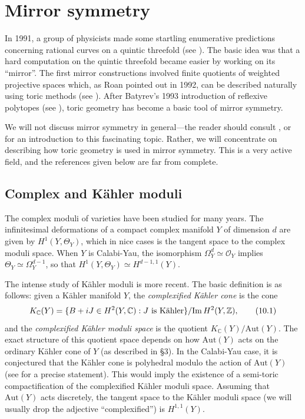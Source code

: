 \documentclass{amsart}
\theoremstyle{plain}
\theoremstyle{definition}
\begin{document}
\section{Mirror symmetry}

	In 1991, a group of physicists made some startling enumerative
predictions concerning rational curves on a quintic threefold (see
\cite{CdGP}).  The basic idea was that a hard computation on the
quintic threefold became easier by working on its ``mirror''.  The
first mirror constructions involved finite quotients of weighted
projective spaces which, as Roan pointed out in 1992, can be described
naturally using toric methods (see \cite{Roa2}).  After Batyrev's 1993
introduction of reflexive polytopes (see \cite{Bat1}), toric geometry
has become a basic tool of mirror symmetry.

	We will not discuss mirror symmetry in general---the reader
should consult \cite{Yau}, \cite{Mor3} or \cite{CK} for an
introduction to this fascinating topic.  Rather, we will concentrate
on describing how toric geometry is used in mirror symmetry.  This is
a very active field, and the references given below are far from
complete.

	\subsection{Complex and K\"ahler moduli} The complex
moduli of varieties have been studied for many years.  The
infinitesimal deformations of a compact complex manifold $Y$ of
dimension $d$ are given by $H^1(Y,\Theta_Y)$, which in nice cases is
the tangent space to the complex moduli space.  When $Y$ is
Calabi-Yau, the isomorphism $\Omega_Y^d \simeq \mathcal{O}_Y$ implies
$\Theta_Y \simeq \Omega_Y^{d-1}$, so that $H^1(Y,\Theta_Y)
\simeq H^{d-1,1}(Y)$.

	The intense study of K\"ahler moduli is more recent.  The
basic definition is as follows: given a K\"ahler manifold $Y$, the
{\it complexified K\"ahler cone\/} is the cone
\begin{equation}
K_\mathbb{C}(Y) = \{B + iJ \in H^2(Y,\mathbb{C}) : J\ \hbox{is K\"ahler}\}
/ \mathrm{Im}\, H^2(Y,\mathbb{Z}),
\tag{10.1}\label{eq:10.1}
\end{equation}
and the {\it complexified K\"ahler moduli space\/} is the quotient
$K_\mathbb{C}(Y)/\mathrm{Aut}(Y)$.  The exact structure of this quotient
space depends on how $\mathrm{Aut}(Y)$ acts on the ordinary K\"ahler
cone of $Y$ (as described in \S3).  In the Calabi-Yau case, it is
conjectured that the K\"ahler cone is polyhedral modulo the action of
$\mathrm{Aut}(Y)$ (see \cite{Mor1} for a precise statement).  This
would imply the existence of a semi-toric compactification of the
complexified K\"ahler moduli space.  Assuming that $\mathrm{Aut}(Y)$
acts discretely, the tangent space to the K\"ahler moduli space (we
will usually drop the adjective ``complexified'') is $H^{1,1}(Y)$.
\end{document}
